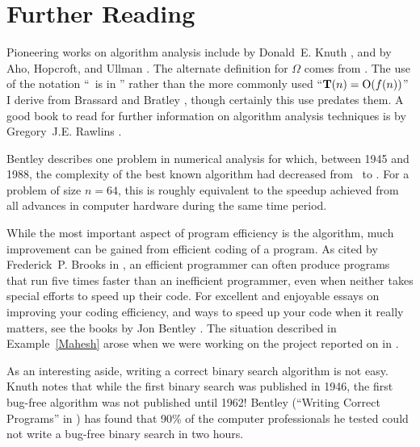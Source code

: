 \newpage

\section{Further Reading}

Pioneering works on algorithm analysis include
 by Donald~E. Knuth
\cite{KnuthV1,KnuthV3},
and  by Aho,
Hopcroft, and Ullman \cite{AHUAlg}.
The alternate definition for \(\Omega\) comes from \cite{AHUDS}.
The use of the notation ``\Tn\ is in \Ofn'' rather than the
more commonly used ``\(\mbox{$\textbf{T}(n)$} = \mbox{${\rm O}(f(n))$}\)'' I derive from
Brassard and Bratley \cite{BB}, though certainly this use predates
them.
A good book to read for further information on algorithm
analysis techniques is  by
Gregory~J.E. Rawlins \cite{Rawlins}.

Bentley \cite{BentleyMore} describes one problem in numerical
analysis for which, between 1945 and 1988,
the complexity of the best known
algorithm had decreased from \Onseven\ to \Onthree.
For a problem of size \(n = 64\), this is roughly equivalent to the
speedup achieved from all advances in computer hardware during the
same time period.

While the most important aspect of program efficiency is the algorithm,
much improvement can be gained from efficient coding of a program.
As cited by Frederick~P. Brooks in 
\cite{Brooks}, an efficient programmer can often 
produce programs that run five times faster than an inefficient
programmer, even when neither takes special efforts to speed up their
code.
For excellent and enjoyable essays on improving your coding
efficiency, and ways to speed up your code when it really matters,
see the books by
Jon Bentley \cite{BentleyEff,BentleyPearl,BentleyMore}.
The situation described in Example~\ref{Mahesh} arose when we were
working on the project reported on in \cite{Ursekar}.

As an interesting aside, writing a correct binary search algorithm
is not easy.
Knuth \cite{KnuthV3} notes that while the first binary search was
published in 1946, the first bug-free algorithm was not published
until 1962!
Bentley (``Writing Correct Programs'' in \cite{BentleyPearl}) has
found that 90\% of the computer professionals he tested could not
write a bug-free binary search in two hours.


